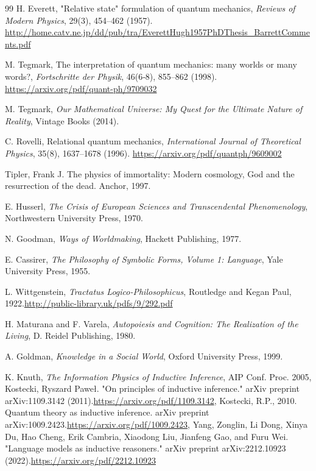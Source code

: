 \documentclass[11pt]{article}
\numberwithin{equation}{section} %
\begin{document}
\begin{thebibliography}{99}
H. Everett, "Relative state" formulation of quantum mechanics, \textit{Reviews of Modern Physics}, 29(3), 454–462 (1957). \url{http://home.catv.ne.jp/dd/pub/tra/EverettHugh1957PhDThesis_BarrettComments.pdf}

M. Tegmark, The interpretation of quantum mechanics: many worlds or many words?, \textit{Fortschritte der Physik}, 46(6‐8), 855–862 (1998). \url{https://arxiv.org/pdf/quant-ph/9709032}

M. Tegmark, \textit{Our Mathematical Universe: My Quest for the Ultimate Nature of Reality}, Vintage Books (2014).

C. Rovelli, Relational quantum mechanics, \textit{International Journal of Theoretical Physics}, 35(8), 1637–1678 (1996). \url{https://arxiv.org/pdf/quantph/9609002}

 Tipler, Frank J. The physics of immortality: Modern cosmology, God and the resurrection of the dead. Anchor, 1997.

E. Husserl, \textit{The Crisis of European Sciences and Transcendental Phenomenology}, Northwestern University Press, 1970.

N. Goodman, \textit{Ways of Worldmaking}, Hackett Publishing, 1977.

E. Cassirer, \textit{The Philosophy of Symbolic Forms, Volume 1: Language}, Yale University Press, 1955.

L. Wittgenstein, \textit{Tractatus Logico-Philosophicus}, Routledge and Kegan Paul, 1922.\url{http://public-library.uk/pdfs/9/292.pdf}

H. Maturana and F. Varela, \textit{Autopoiesis and Cognition: The Realization of the Living}, D. Reidel Publishing, 1980.

A. Goldman, \textit{Knowledge in a Social World}, Oxford University Press, 1999.

K. Knuth, \textit{The Information Physics of Inductive Inference}, AIP Conf. Proc. 2005, Kostecki, Ryszard Paweł. "On principles of inductive inference." arXiv preprint arXiv:1109.3142 (2011).\url{https://arxiv.org/pdf/1109.3142}, Kostecki, R.P., 2010. Quantum theory as inductive inference. arXiv preprint arXiv:1009.2423.\url{https://arxiv.org/pdf/1009.2423}, Yang, Zonglin, Li Dong, Xinya Du, Hao Cheng, Erik Cambria, Xiaodong Liu, Jianfeng Gao, and Furu Wei. "Language models as inductive reasoners." arXiv preprint arXiv:2212.10923 (2022).\url{https://arxiv.org/pdf/2212.10923}

\end{thebibliography}
\end{document}
